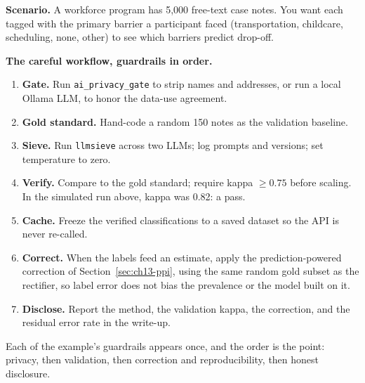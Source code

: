 \documentclass[
    a4paper,
    fontsize=10pt,
    twoside=true,
    numbers=noenddot,
]{kaobook}
\newcounter{appliedexample}
\newenvironment{appliedexample}[1][]{%
    \refstepcounter{appliedexample}%
    \begin{appliedexamplebox}[frametitle={Applied Example~\theappliedexample.~~#1}]%
}{%
    \end{appliedexamplebox}%
}
\begin{document}
\begin{appliedexample}[Coding 5,000 progress notes without getting burned]\label{ae:ch13-notes}
\textbf{Scenario.} A workforce program has 5,000 free-text case notes. You want each tagged with the primary barrier a participant faced (transportation, childcare, scheduling, none, other) to see which barriers predict drop-off.

\medskip
\textbf{The careful workflow, guardrails in order.}
\begin{enumerate}
    \item \textbf{Gate.} Run \texttt{ai\_privacy\_gate} to strip names and addresses, or run a local Ollama LLM, to honor the data-use agreement.
    \item \textbf{Gold standard.} Hand-code a random 150 notes as the validation baseline.
    \item \textbf{Sieve.} Run \texttt{llmsieve} across two LLMs; log prompts and versions; set temperature to zero.
    \item \textbf{Verify.} Compare to the gold standard; require kappa $\ge 0.75$ before scaling. In the simulated run above, kappa was 0.82: a pass.
    \item \textbf{Cache.} Freeze the verified classifications to a saved dataset so the API is never re-called.
    \item \textbf{Correct.} When the labels feed an estimate, apply the prediction-powered correction of Section~\ref{sec:ch13-ppi}, using the same random gold subset as the rectifier, so label error does not bias the prevalence or the model built on it.
    \item \textbf{Disclose.} Report the method, the validation kappa, the correction, and the residual error rate in the write-up.
\end{enumerate}
Each of the example's guardrails appears once, and the order is the point: privacy, then validation, then correction and reproducibility, then honest disclosure.
\end{appliedexample}
\end{document}
